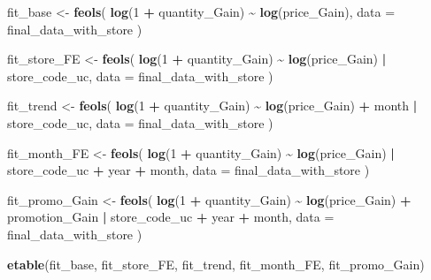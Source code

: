 \documentclass[
]{article}
\newenvironment{Shaded}{\begin{snugshade}}{\end{snugshade}}
\newcommand{\AttributeTok}[1]{\textcolor[rgb]{0.13,0.29,0.53}{#1}}
\newcommand{\DecValTok}[1]{\textcolor[rgb]{0.00,0.00,0.81}{#1}}
\newcommand{\FunctionTok}[1]{\textcolor[rgb]{0.13,0.29,0.53}{\textbf{#1}}}
\newcommand{\NormalTok}[1]{#1}
\newcommand{\OtherTok}[1]{\textcolor[rgb]{0.56,0.35,0.01}{#1}}
\newcommand{\SpecialCharTok}[1]{\textcolor[rgb]{0.81,0.36,0.00}{\textbf{#1}}}
\begin{document}
\begin{Shaded}
\begin{Highlighting}[]
\NormalTok{fit\_base }\OtherTok{\textless{}{-}} \FunctionTok{feols}\NormalTok{(}
  \FunctionTok{log}\NormalTok{(}\DecValTok{1} \SpecialCharTok{+}\NormalTok{ quantity\_Gain) }\SpecialCharTok{\textasciitilde{}} \FunctionTok{log}\NormalTok{(price\_Gain),}
  \AttributeTok{data =}\NormalTok{ final\_data\_with\_store}
\NormalTok{)}

\NormalTok{fit\_store\_FE }\OtherTok{\textless{}{-}} \FunctionTok{feols}\NormalTok{(}
  \FunctionTok{log}\NormalTok{(}\DecValTok{1} \SpecialCharTok{+}\NormalTok{ quantity\_Gain) }\SpecialCharTok{\textasciitilde{}} \FunctionTok{log}\NormalTok{(price\_Gain) }\SpecialCharTok{|}\NormalTok{ store\_code\_uc,}
  \AttributeTok{data =}\NormalTok{ final\_data\_with\_store}
\NormalTok{)}

\NormalTok{fit\_trend }\OtherTok{\textless{}{-}} \FunctionTok{feols}\NormalTok{(}
  \FunctionTok{log}\NormalTok{(}\DecValTok{1} \SpecialCharTok{+}\NormalTok{ quantity\_Gain) }\SpecialCharTok{\textasciitilde{}} \FunctionTok{log}\NormalTok{(price\_Gain) }\SpecialCharTok{+}\NormalTok{ month }\SpecialCharTok{|}\NormalTok{ store\_code\_uc,}
  \AttributeTok{data =}\NormalTok{ final\_data\_with\_store}
\NormalTok{)}

\NormalTok{fit\_month\_FE }\OtherTok{\textless{}{-}} \FunctionTok{feols}\NormalTok{(}
  \FunctionTok{log}\NormalTok{(}\DecValTok{1} \SpecialCharTok{+}\NormalTok{ quantity\_Gain) }\SpecialCharTok{\textasciitilde{}} \FunctionTok{log}\NormalTok{(price\_Gain) }\SpecialCharTok{|}\NormalTok{ store\_code\_uc }\SpecialCharTok{+}\NormalTok{ year }\SpecialCharTok{+}\NormalTok{ month,}
  \AttributeTok{data =}\NormalTok{ final\_data\_with\_store}
\NormalTok{)}

\NormalTok{fit\_promo\_Gain }\OtherTok{\textless{}{-}} \FunctionTok{feols}\NormalTok{(}
  \FunctionTok{log}\NormalTok{(}\DecValTok{1} \SpecialCharTok{+}\NormalTok{ quantity\_Gain) }\SpecialCharTok{\textasciitilde{}} \FunctionTok{log}\NormalTok{(price\_Gain) }\SpecialCharTok{+}\NormalTok{ promotion\_Gain }\SpecialCharTok{|}\NormalTok{ store\_code\_uc }\SpecialCharTok{+} 
\NormalTok{    year }\SpecialCharTok{+}\NormalTok{ month,}
  \AttributeTok{data =}\NormalTok{ final\_data\_with\_store}
\NormalTok{)}

\FunctionTok{etable}\NormalTok{(fit\_base, fit\_store\_FE, fit\_trend, fit\_month\_FE, fit\_promo\_Gain)}
\end{Highlighting}
\end{Shaded}
\end{document}

